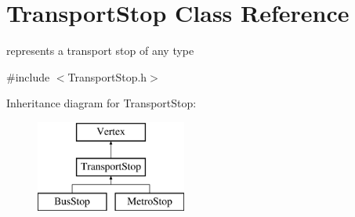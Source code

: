 \hypertarget{class_transport_stop}{}\section{Transport\+Stop Class Reference}
\label{class_transport_stop}


represents a transport stop of any type  




{\ttfamily \#include $<$Transport\+Stop.\+h$>$}

Inheritance diagram for Transport\+Stop\+:\begin{figure}[H]
\begin{center}
\leavevmode
\includegraphics[height=3.000000cm]{class_transport_stop}
\end{center}
\end{figure}

